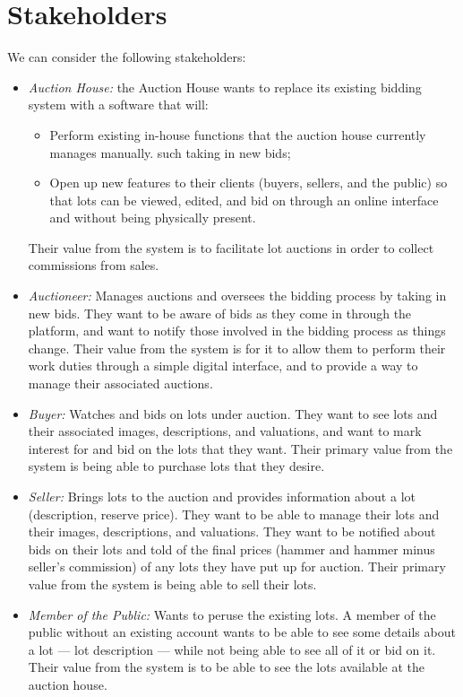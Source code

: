 \documentclass[titlepage, 12pt]{extarticle}
\begin{document}
\section{Stakeholders}
We can consider the following stakeholders:
\begin{itemize}
\item {\it Auction House:} the Auction House wants to replace its existing bidding system with a software that will:
  \begin{itemize}
  \item Perform existing in-house functions that the auction house currently manages manually. such taking in new bids;
  \item Open up new features to their clients (buyers, sellers, and the public) so that lots can be viewed, edited, and bid on through an online interface and without being physically present.
  \end{itemize}
  Their value from the system is to facilitate lot auctions in order to collect commissions from sales.
\item {\it Auctioneer:} Manages auctions and oversees the bidding process by taking in new bids. They want to be aware of bids as they come in through the platform, and want to notify those involved in the bidding process as things change. Their value from the system is for it to allow them to perform their work duties through a simple digital interface, and to provide a way to manage their associated auctions.
\item {\it Buyer:} Watches and bids on lots under auction. They want to see lots and their associated images, descriptions, and valuations, and want to mark interest for and bid on the lots that they want. Their primary value from the system is being able to purchase lots that they desire. 
\item {\it Seller:} Brings lots to the auction and provides information about a lot (description, reserve price). They want to be able to manage their lots and their images, descriptions, and valuations. They want to be notified about bids on their lots and told of the final prices (hammer and hammer minus seller's commission) of any lots they have put up for auction. Their primary value from the system is being able to sell their lots. 
\item {\it Member of the Public:} Wants to peruse the existing lots. A member of the public without an existing account wants to be able to see some details about a lot --- lot description --- while not being able to see all of it or bid on it. Their value from the system is to be able to see the lots available at the auction house. 

\end{itemize}
\end{document}
